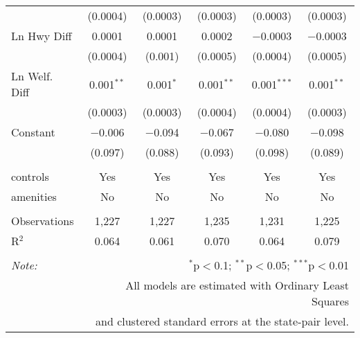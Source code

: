 \begin{table}[!htbp]
\begin{tabular}{@{\extracolsep{5pt}}lccccc}
  & (0.0004) & (0.0003) & (0.0003) & (0.0003) & (0.0003) \\ 
  Ln Hwy Diff & 0.0001 & 0.0001 & 0.0002 & $-$0.0003 & $-$0.0003 \\ 
  & (0.0004) & (0.001) & (0.0005) & (0.0004) & (0.0005) \\ 
  Ln Welf. Diff & 0.001$^{**}$ & 0.001$^{*}$ & 0.001$^{**}$ & 0.001$^{***}$ & 0.001$^{**}$ \\ 
  & (0.0003) & (0.0003) & (0.0004) & (0.0004) & (0.0003) \\ 
  Constant & $-$0.006 & $-$0.094 & $-$0.067 & $-$0.080 & $-$0.098 \\ 
  & (0.097) & (0.088) & (0.093) & (0.098) & (0.089) \\ 
 \hline \\[-1.8ex] 
controls & Yes & Yes & Yes & Yes & Yes \\ 
amenities & No & No & No & No & No \\ 
\hline \\[-1.8ex] 
Observations & 1,227 & 1,227 & 1,235 & 1,231 & 1,225 \\ 
R$^{2}$ & 0.064 & 0.061 & 0.070 & 0.064 & 0.079 \\ 
\hline 
\hline \\[-1.8ex] 
\textit{Note:}  & \multicolumn{5}{r}{$^{*}$p$<$0.1; $^{**}$p$<$0.05; $^{***}$p$<$0.01} \\ 
 & \multicolumn{5}{r}{All models are estimated with Ordinary Least Squares} \\ 
 & \multicolumn{5}{r}{and clustered standard errors at the state-pair level.} \\ 
\end{tabular} 
\end{table} 
